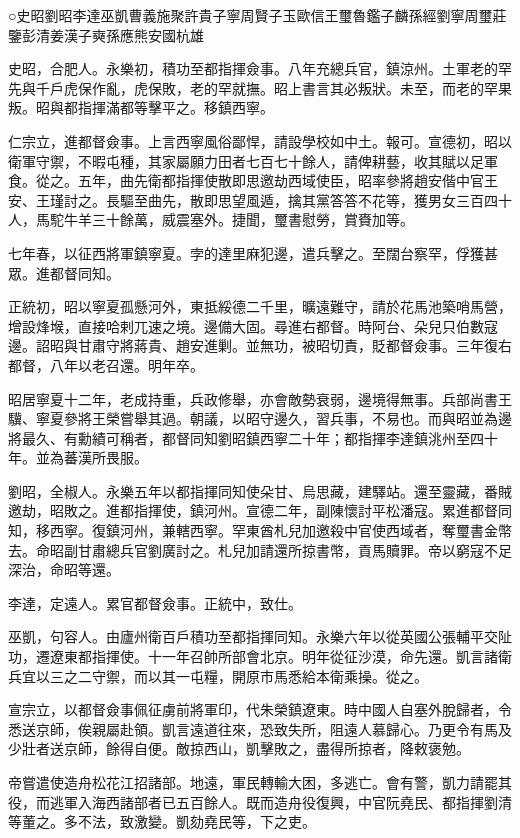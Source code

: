 
\begin{pinyinscope}
○史昭劉昭李達巫凱曹義施聚許貴子寧周賢子玉歐信王璽魯鑑子麟孫經劉寧周璽莊鑒彭清姜漢子奭孫應熊安國杭雄

史昭，合肥人。永樂初，積功至都指揮僉事。八年充總兵官，鎮涼州。土軍老的罕先與千戶虎保作亂，虎保敗，老的罕就撫。昭上書言其必叛狀。未至，而老的罕果叛。昭與都指揮滿都等擊平之。移鎮西寧。

仁宗立，進都督僉事。上言西寧風俗鄙悍，請設學校如中土。報可。宣德初，昭以衛軍守禦，不暇屯種，其家屬願力田者七百七十餘人，請俾耕藝，收其賦以足軍食。從之。五年，曲先衛都指揮使散即思邀劫西域使臣，昭率參將趙安偕中官王安、王瑾討之。長驅至曲先，散即思望風遁，擒其黨答答不花等，獲男女三百四十人，馬駝牛羊三十餘萬，威震塞外。捷聞，璽書慰勞，賞賚加等。

七年春，以征西將軍鎮寧夏。孛的達里麻犯邊，遣兵擊之。至闊台察罕，俘獲甚眾。進都督同知。

正統初，昭以寧夏孤懸河外，東抵綏德二千里，曠遠難守，請於花馬池築哨馬營，增設烽堠，直接哈剌兀速之境。邊備大固。尋進右都督。時阿台、朵兒只伯數寇邊。詔昭與甘肅守將蔣貴、趙安進剿。並無功，被昭切責，貶都督僉事。三年復右都督，八年以老召還。明年卒。

昭居寧夏十二年，老成持重，兵政修舉，亦會敵勢衰弱，邊境得無事。兵部尚書王驥、寧夏參將王榮嘗舉其過。朝議，以昭守邊久，習兵事，不易也。而與昭並為邊將最久、有勳績可稱者，都督同知劉昭鎮西寧二十年；都指揮李達鎮洮州至四十年。並為蕃漢所畏服。

劉昭，全椒人。永樂五年以都指揮同知使朵甘、烏思藏，建驛站。還至靈藏，番賊邀劫，昭敗之。進都指揮使，鎮河州。宣德二年，副陳懷討平松潘寇。累進都督同知，移西寧。復鎮河州，兼轄西寧。罕東酋札兒加邀殺中官使西域者，奪璽書金幣去。命昭副甘肅總兵官劉廣討之。札兒加請還所掠書幣，貢馬贖罪。帝以窮寇不足深治，命昭等還。

李達，定遠人。累官都督僉事。正統中，致仕。

巫凱，句容人。由廬州衛百戶積功至都指揮同知。永樂六年以從英國公張輔平交阯功，遷遼東都指揮使。十一年召帥所部會北京。明年從征沙漠，命先還。凱言諸衛兵宜以三之二守禦，而以其一屯糧，開原市馬悉給本衛乘操。從之。

宣宗立，以都督僉事佩征虜前將軍印，代朱榮鎮遼東。時中國人自塞外脫歸者，令悉送京師，俟親屬赴領。凱言遠道往來，恐致失所，阻遠人慕歸心。乃更令有馬及少壯者送京師，餘得自便。敵掠西山，凱擊敗之，盡得所掠者，降敕褒勉。

帝嘗遣使造舟松花江招諸部。地遠，軍民轉輸大困，多逃亡。會有警，凱力請罷其役，而逃軍入海西諸部者已五百餘人。既而造舟役復興，中官阮堯民、都指揮劉清等董之。多不法，致激變。凱劾堯民等，下之吏。


\end{pinyinscope}
